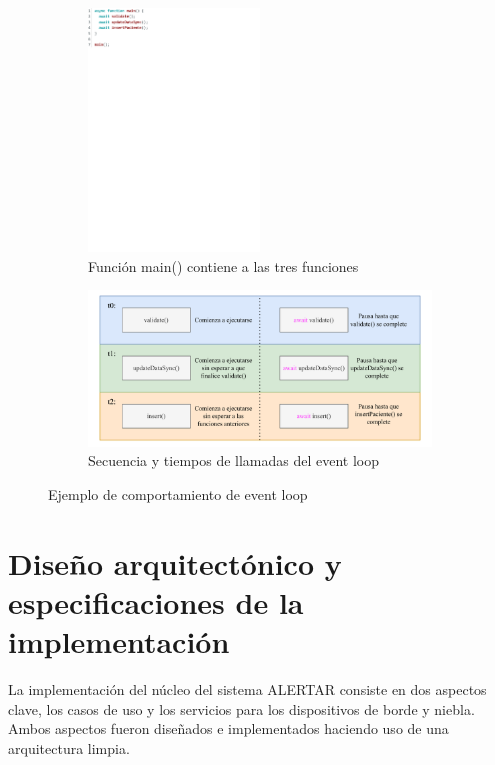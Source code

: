 \begin{figure}[]
    \centering    
    \begin{subfigure}{\textwidth}
        \centering 
        \includegraphics[width=0.5\textwidth]{Imagenes/Implementacion/eventLoopCodigo.pdf}
        \caption{Función main() contiene a las tres funciones}
        \label{fig:eventLoopCodigo}
    \end{subfigure}
    \begin{subfigure}{\textwidth}
        \centering 
        \includegraphics[width=\textwidth]{Imagenes/Implementacion/eventLoop.pdf}
        \caption{Secuencia y tiempos de llamadas del event loop}
        \label{fig:eventLoop}
    \end{subfigure}
    \caption{Ejemplo de comportamiento de event loop}
    \label{fig:ejemploEventLoop}
\end{figure}

\section{Diseño arquitectónico y especificaciones de la implementación}
\label{sec:implementacion}
La implementación del núcleo del sistema ALERTAR consiste en dos aspectos clave, los casos de uso y los servicios para los dispositivos de borde y niebla. Ambos aspectos fueron diseñados e implementados haciendo uso de una arquitectura limpia.

